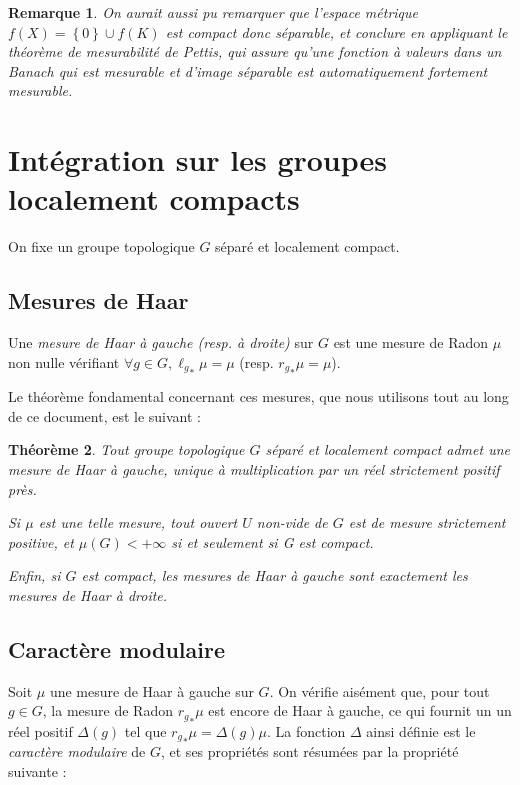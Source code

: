 \documentclass[a4paper,12pt]{article}
\newtheorem{theorem}{Théorème}[section]
\newtheorem{remark}[theorem]{Remarque}
\newcommand{\set}[1]{\left\{ #1 \right\}}
\newcommand{\ssi}{si et seulement si }
\begin{document}
\begin{remark}
    On aurait aussi pu remarquer que l'espace métrique $f(X) = \set{0}\cup f(K)$ est compact donc séparable,
    et conclure en appliquant le théorème de mesurabilité de Pettis, qui assure qu'une fonction à valeurs dans un Banach 
    qui est mesurable et d'image séparable est automatiquement fortement mesurable.
\end{remark}

\section{Intégration sur les groupes localement compacts}\label{appendix_integration}

On fixe un groupe topologique $G$ séparé et localement compact.

\subsection*{Mesures de Haar}

Une \emph{mesure de Haar à gauche (resp. à droite)} sur $G$
est une mesure de Radon $\mu$ non nulle vérifiant $\forall g\in G, {\ell_g}_*\mu = \mu$ (resp. ${r_g}_*\mu = \mu$).

Le théorème fondamental concernant ces mesures, que nous utilisons tout au long de ce document, est le suivant :
\begin{theorem}\label{theorem_Haar}
    Tout groupe topologique $G$ séparé et localement compact admet une mesure de Haar à gauche, unique à multiplication par un réel strictement 
    positif près. 
    
    Si $\mu$ est une telle mesure, tout ouvert $U$ non-vide de $G$ est de mesure strictement positive,
    et $\mu(G)<+\infty$ \ssi G est compact.

    Enfin, si $G$ est compact, les mesures de Haar à gauche sont exactement les mesures de Haar à droite.
\end{theorem}

\subsection*{Caractère modulaire}

Soit $\mu$ une mesure de Haar à gauche sur $G$. On vérifie aisément que, pour tout $g\in G$, la
mesure de Radon ${r_g}_*\mu$ est encore de Haar à gauche, ce qui fournit un un réel positif $\Delta(g)$ tel que 
${r_g}_*\mu = \Delta(g)\mu$. La fonction $\Delta$ ainsi définie est le \emph{caractère modulaire} de $G$,
et ses propriétés sont résumées par la propriété suivante :
\end{document}

